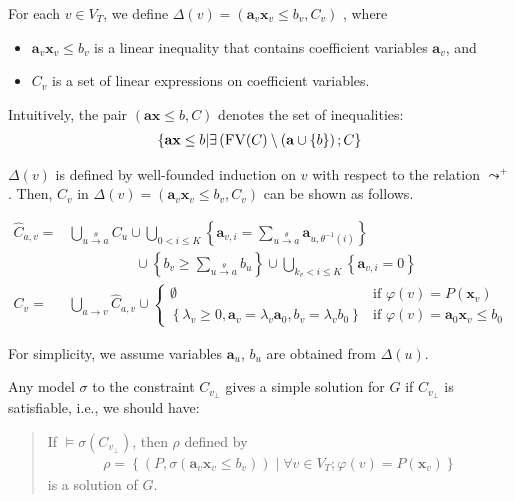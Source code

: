 \documentclass[a4paper,12pt]{article}
\newcommand{\edge}[2]{#1\rightarrow#2}
\newcommand{\edgel}[3]{#1\xrightarrow{#2}#3}
\begin{document}
For each $v \in V_T$, we define
$\Delta(v) = (\mathbf{a}_v \mathbf{x}_v \leq b_v, C_v)$
, where
\begin{itemize}
\item $\mathbf{a}_v \mathbf{x}_v \leq b_v$ is a linear inequality that
  contains coefficient variables $\mathbf{a}_v$, and
\item $C_v$ is a set of linear expressions on coefficient variables.
\end{itemize}
Intuitively, the pair $(\mathbf{a} \mathbf{x} \leq b, C)$ denotes the
set of inequalities:
\begin{align*}
\left\lbrace
 \mathbf{a} \mathbf{x} \leq b \middle|
 \exists \left( \textsc{FV}(C)
  \setminus (\mathbf{a} \cup \left\lbrace b \right\rbrace
 \right); C
\right\rbrace
\end{align*}

$\Delta(v)$ is defined by well-founded induction on $v$ with respect
to the relation $\leadsto^+$. Then, $C_v$ in
$\Delta(v) = \left( \mathbf{a}_v \mathbf{x}_v \leq b_v, C_v \right)$
can be shown as follows.

\begin{align*}
\hat C_{a,v} = &
 \bigcup_{\edgel{u}{\theta}{a}} C_u \cup
 \bigcup_{0 < i \leq K}
 \left\lbrace
  \mathbf{a}_{v,i} = \sum_{\edgel{u}{\theta}{a}} \mathbf{a}_{u, \theta^{-1} (i)}
 \right\rbrace \\
 & \hspace{2cm} \cup
 \left\lbrace
  b_v \geq \sum_{\edgel{u}{\theta}{a}} b_u
 \right\rbrace \cup
 \bigcup_{k_v < i \leq K}
 \left\lbrace \mathbf{a}_{v,i} = 0 \right\rbrace
\\
C_v = & \bigcup_{\edge{a}{v}} \hat C_{a,v} \cup
\begin{cases}
\emptyset
& \mbox{if } \varphi(v) = P(\mathbf{x}_v) \\
\left\lbrace
 \lambda_v \geq 0, \mathbf{a}_v = \lambda_v \mathbf{a}_0,
 b_v = \lambda_v b_0
\right\rbrace
& \mbox{if } \varphi(v) = \mathbf{a}_0 \mathbf{x}_v \leq b_0
\end{cases}
\end{align*}

For simplicity, we assume variables $\mathbf{a}_u$, $b_u$ are obtained
from $\Delta(u)$.

Any model $\sigma$ to the constraint $C_{v_\bot}$ gives a simple
solution for $G$ if $C_{v_\bot}$ is satisfiable, i.e., we should have:

\begin{quote}
If $\models \sigma(C_{v_\bot})$, then $\rho$ defined by
\begin{align*}
 \rho = \left\lbrace
  \left( P, \sigma(\mathbf{a}_v \mathbf{x}_v \leq b_v) \right) \middle|
  \forall v \in V_T; \varphi(v) = P(\mathbf{x}_v)
 \right\rbrace
\end{align*}
is a solution of $G$.
\end{quote}
\end{document}
